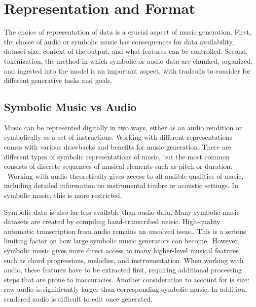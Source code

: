 \section{Representation and Format}\label{section:representation}
The choice of representation of data is a crucial aspect of music generation. First, the choice of audio or symbolic music has consequences for data availability, dataset size, context of the output, and what features can be controlled. Second, tokenization, the method in which symbolic or audio data are chunked, organized, and ingested into the model is an important aspect, with tradeoffs to consider for different generative tasks and goals. 


\subsection{Symbolic Music vs Audio}\label{section:symbolic_audio}
Music can be represented digitally in two ways, either as an audio rendition or symbolically as a set of instructions. Working with different representations comes with various drawbacks and benefits for music generation. There are different types of symbolic representations of music, but the most common consists of discrete sequences of musical elements such as pitch or duration.  Working with audio theoretically gives access to all audible qualities of music, including detailed information on instrumental timbre or acoustic settings. In symbolic music, this is more restricted. 

Symbolic data is also far less available than audio data. Many symbolic music datasets are created by compiling hand-transcribed music. High-quality automatic transcription from audio remains an unsolved issue.\cite{Ji_Yang_Luo_survey_symbolic_2024}\cite{Chen_Smith_Spijkervet_Wang_Zou_Li_Kong_Du_2024}. This is a serious limiting factor on how large symbolic music generators can become. However, symbolic music gives more direct access to many higher-level musical features such as chord progressions, melodies, and instrumentation. When working with audio, these features have to be extracted first, requiring additional processing steps that are prone to inaccuracies. 
Another consideration to account for is size: raw audio is significantly larger than corresponding symbolic music. In addition, rendered audio is difficult to edit once generated. 
 
